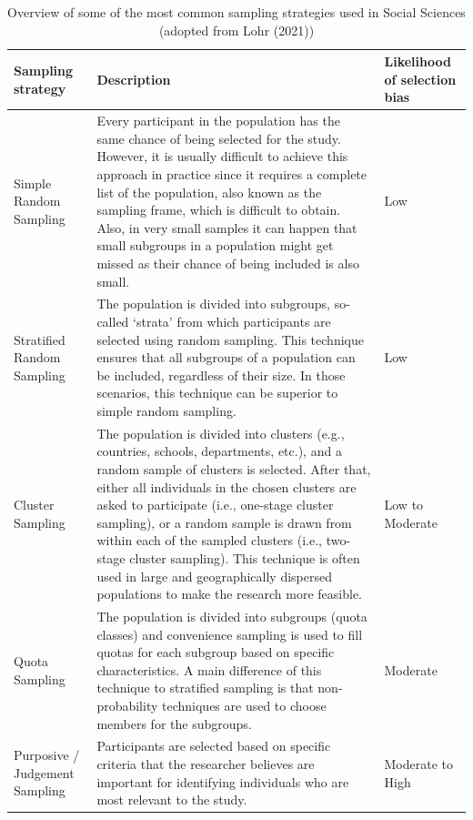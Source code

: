 \documentclass[
  letterpaper,
  DIV=11,
  numbers=noendperiod]{scrreprt}
\begin{document}
\begin{longtable}{>{\raggedright\arraybackslash}p{\dimexpr 56.25pt -2\tabcolsep-1.5\arrayrulewidth}>{\raggedright\arraybackslash}p{\dimexpr 232.50pt -2\tabcolsep-1.5\arrayrulewidth}>{\raggedright\arraybackslash}p{\dimexpr 52.50pt -2\tabcolsep-1.5\arrayrulewidth}}

\caption{\label{tbl-sampling-strategies}Overview of some of the most
common sampling strategies used in Social Sciences (adopted from Lohr
(2021))}

\tabularnewline

\toprule
Sampling strategy & Description & Likelihood of selection bias \\ 
\midrule\addlinespace[2.5pt]
Simple Random Sampling & Every participant in the population has the same chance of being selected for the study. However, it is usually difficult to achieve this approach in practice since it requires a complete list of the population, also known as the sampling frame, which is difficult to obtain. Also, in very small samples it can happen that small subgroups in a population might get missed as their chance of being included is also small. & Low \\ 
Stratified Random Sampling & The population is divided into subgroups, so-called `strata' from which participants are selected using random sampling. This technique ensures that all subgroups of a population can be included, regardless of their size. In those scenarios, this technique can be superior to simple random sampling. & Low \\ 
Cluster Sampling & The population is divided into clusters (e.g., countries, schools, departments, etc.), and a random sample of clusters is selected. After that, either all individuals in the chosen clusters are asked to participate (i.e., one-stage cluster sampling), or a random sample is drawn from within each of the sampled clusters (i.e., two-stage cluster sampling). This technique is often used in large and geographically dispersed populations to make the research more feasible. & Low to Moderate \\ 
Quota Sampling & The population is divided into subgroups (quota classes) and convenience sampling is used to fill quotas for each subgroup based on specific characteristics. A main difference of this technique to stratified sampling is that non-probability techniques are used to choose members for the subgroups. & Moderate \\ 
Purposive / Judgement Sampling & Participants are selected based on specific criteria that the researcher believes are important for identifying individuals who are most relevant to the study. & Moderate to High \\ 

\end{longtable}
\end{document}
